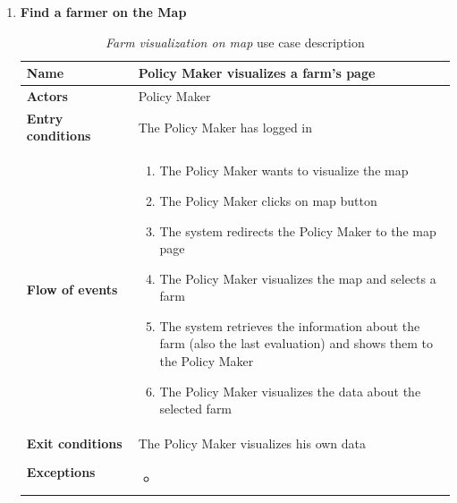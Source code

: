 \begin{enumerate}
    \item \textbf{Find a farmer on the Map}
    \begin{longtable}{p{0.26\linewidth}p{0.75\linewidth}}
        \toprule
        \textbf{Name} & \textbf{Policy Maker visualizes a farm’s page} \\
        \midrule
        \textbf{Actors} & Policy Maker \\
        \midrule
        \textbf{Entry conditions} & The Policy Maker has logged in\\
        \midrule
        \textbf{Flow of events} & 
        \begin{enumerate}
            \item The Policy Maker wants to visualize the map
            \item The Policy Maker clicks on map button
            \item The system redirects the Policy Maker to the map page
            \item The Policy Maker visualizes the map and selects a farm
            \item The system retrieves the information about the farm (also the last evaluation) and shows them to the Policy Maker
            \item The Policy Maker visualizes the data about the selected farm
        \end{enumerate} \\
        \midrule
        \textbf{Exit conditions} & The Policy Maker visualizes his own data\\
        \midrule
        \textbf{Exceptions} & 
        \begin{itemize}
            \item 
        \end{itemize}\\
        \bottomrule
        \caption{\emph{Farm visualization on map} use case description}
    \end{longtable}


\end{enumerate}
